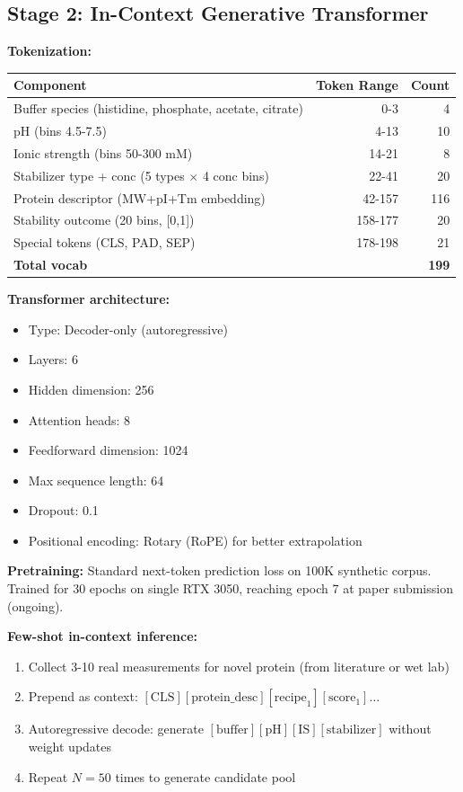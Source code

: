 \documentclass[11pt]{article}
\begin{document}
\subsection{Stage 2: In-Context Generative Transformer}

\textbf{Tokenization:}
\begin{table}[h]
\centering
\begin{tabular}{lrr}
\toprule
\textbf{Component} & \textbf{Token Range} & \textbf{Count} \\
\midrule
Buffer species (histidine, phosphate, acetate, citrate) & 0-3 & 4 \\
pH (bins 4.5-7.5) & 4-13 & 10 \\
Ionic strength (bins 50-300 mM) & 14-21 & 8 \\
Stabilizer type + conc (5 types $\times$ 4 conc bins) & 22-41 & 20 \\
Protein descriptor (MW+pI+Tm embedding) & 42-157 & 116 \\
Stability outcome (20 bins, [0,1]) & 158-177 & 20 \\
Special tokens (CLS, PAD, SEP) & 178-198 & 21 \\
\midrule
\textbf{Total vocab} & & \textbf{199} \\
\bottomrule
\end{tabular}
\end{table}

\textbf{Transformer architecture:}
\begin{itemize}
    \item Type: Decoder-only (autoregressive)
    \item Layers: 6
    \item Hidden dimension: 256
    \item Attention heads: 8
    \item Feedforward dimension: 1024
    \item Max sequence length: 64
    \item Dropout: 0.1
    \item Positional encoding: Rotary (RoPE) for better extrapolation
\end{itemize}

\textbf{Pretraining:} Standard next-token prediction loss on 100K synthetic corpus. Trained for 30 epochs on single RTX 3050, reaching epoch 7 at paper submission (ongoing).

\textbf{Few-shot in-context inference:}
\begin{enumerate}
    \item Collect 3-10 real measurements for novel protein (from literature or wet lab)
    \item Prepend as context: $[\text{CLS}] [\text{protein\_desc}] [\text{recipe}_1] [\text{score}_1] \ldots$
    \item Autoregressive decode: generate $[\text{buffer}] [\text{pH}] [\text{IS}] [\text{stabilizer}]$ without weight updates
    \item Repeat $N=50$ times to generate candidate pool
\end{enumerate}
\end{document}
